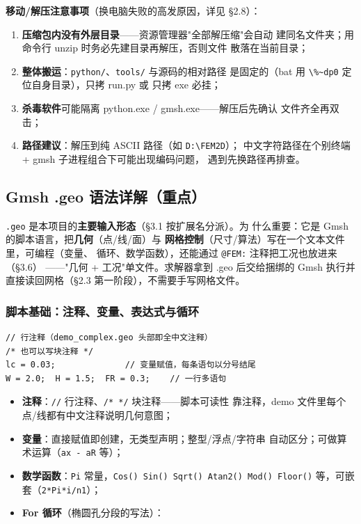 \documentclass[12pt,a4paper]{ctexart}
\newcommand{\fem}{\Verb}
\begin{document}
\textbf{移动/解压注意事项}（换电脑失败的高发原因，详见 §2.8）：

\begin{enumerate}[leftmargin=*]
  \item \textbf{压缩包内没有外层目录}——资源管理器"全部解压缩"会自动
        建同名文件夹；用命令行 unzip 时务必先建目录再解压，否则文件
        散落在当前目录；
  \item \textbf{整体搬运}：\fem|python/|、\fem|tools/| 与源码的相对路径
        是固定的（bat 用 \fem|\%~dp0| 定位自身目录），只拷 run.py 或
        只拷 exe 必挂；
  \item \textbf{杀毒软件}可能隔离 python.exe / gmsh.exe——解压后先确认
        文件齐全再双击；
  \item \textbf{路径建议}：解压到纯 ASCII 路径（如 \fem|D:\FEM2D|）；
        中文字符路径在个别终端 + gmsh 子进程组合下可能出现编码问题，
        遇到先换路径再排查。
\end{enumerate}

\subsection{Gmsh .geo 语法详解（重点）}

\fem|.geo| 是本项目的\textbf{主要输入形态}（§3.1 按扩展名分派）。为
什么重要：它是 Gmsh 的脚本语言，把\textbf{几何}（点/线/面）与
\textbf{网格控制}（尺寸/算法）写在一个文本文件里，可编程（变量、
循环、数学函数），还能通过 \fem|@FEM:| 注释把工况也放进来（§3.6）
——"几何 + 工况"单文件。求解器拿到 .geo 后交给捆绑的 Gmsh 执行并
直接读回网格（§2.3 第一阶段），不需要手写网格文件。

\subsubsection{脚本基础：注释、变量、表达式与循环}

\begin{lstlisting}
// 行注释（demo_complex.geo 头部即全中文注释）
/* 也可以写块注释 */
lc = 0.03;              // 变量赋值，每条语句以分号结尾
W = 2.0;  H = 1.5;  FR = 0.3;    // 一行多语句
\end{lstlisting}

\begin{itemize}[leftmargin=*]
  \item \textbf{注释}：\fem|//| 行注释、\fem|/* */| 块注释——脚本可读性
        靠注释，demo 文件里每个点/线都有中文注释说明几何意图；
  \item \textbf{变量}：直接赋值即创建，无类型声明；整型/浮点/字符串
        自动区分；可做算术运算（\fem|ax - aR| 等）；
  \item \textbf{数学函数}：\fem|Pi| 常量，\fem|Cos() Sin() Sqrt() Atan2() Mod() Floor()| 等，可嵌套（\fem|2*Pi*i/n1|）；
  \item \textbf{For 循环}（椭圆孔分段的写法）：
\end{itemize}
\end{document}
